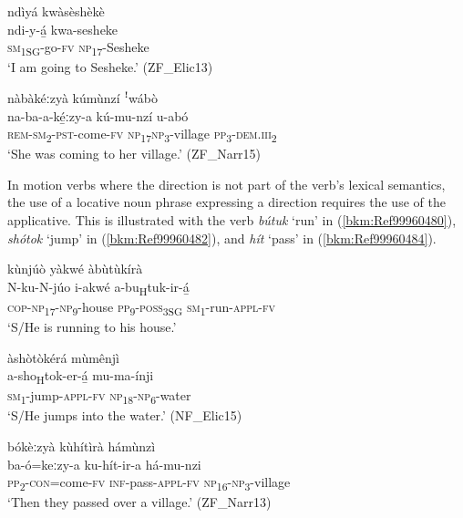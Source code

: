 \ea
\label{bkm:Ref99960396}
ndìyá kwàsèshèkè\\
\gll ndi-y-á̲  kwa-sesheke\\
\textsc{sm}\textsubscript{1SG}-go-\textsc{fv}  \textsc{np}\textsubscript{17}-Sesheke \\
\glt ‘I am going to Sesheke.’ (ZF\_Elic13)
\z

\ea
\label{bkm:Ref99960398}
nàbàkéːzyà kúmùnzí ꜝwábò\\
\gll na-ba-a-ké̲ːzy-a    kú-mu-nzí    u-abó\\
\textsc{rem}-\textsc{sm}\textsubscript{2}-\textsc{pst}-come-\textsc{fv}  \textsc{np}\textsubscript{17}\-\textsc{np}\textsubscript{3}-village  \textsc{pp}\textsubscript{3}\--\textsc{dem}.\textsc{iii}\textsubscript{2}\\
\glt ‘She was coming to her village.’ (ZF\_Narr15)
\z

In motion verbs where the direction is not part of the verb’s lexical semantics, the use of a locative noun phrase expressing a direction requires the use of the applicative. This is illustrated with the verb \textit{bútuk} ‘run’ in (\ref{bkm:Ref99960480}), \textit{shótok} ‘jump’ in (\ref{bkm:Ref99960482}), and \textit{hít} ‘pass’ in (\ref{bkm:Ref99960484}).

\ea
\label{bkm:Ref99960480}
kùnjúò yàkwé àbùtùkírà\\
\gll N-ku-N-júo      i-akwé  a-bu\textsubscript{H}tuk-ir-á̲\\
\textsc{cop}-\textsc{np}\textsubscript{17}-\textsc{np}\textsubscript{9}-house  \textsc{pp}\textsubscript{9}-\textsc{poss}\textsubscript{3SG}  \textsc{sm}\textsubscript{1}-run-\textsc{appl}-\textsc{fv}\\
\glt ‘S/He is running to his house.’
\z

\ea
\label{bkm:Ref99960482}
àshòtòkérá mùmênjì\\
\gll a-sho\textsubscript{H}tok-er-á̲  mu-ma-ínji\\
\textsc{sm}\textsubscript{1}-jump-\textsc{appl}-\textsc{fv}  \textsc{np}\textsubscript{18}-\textsc{np}\textsubscript{6}-water\\
\glt ‘S/He jumps into the water.’ (NF\_Elic15)
\z

\ea
\label{bkm:Ref99960484}
bókèːzyà kùhítìrà hámùnzì\\
\gll ba-ó=keːzy-a    ku-hít-ir-a    há-mu-nzi\\
\textsc{pp}\textsubscript{2}-\textsc{con}=come-\textsc{fv}  \textsc{inf}-pass-\textsc{appl}-\textsc{fv}  \textsc{np}\textsubscript{16}-\textsc{np}\textsubscript{3}-village\\
\glt ‘Then they passed over a village.’ (ZF\_Narr13)
\z

